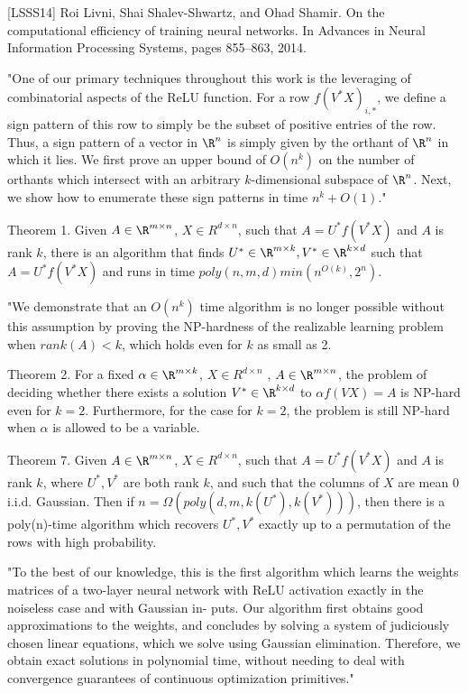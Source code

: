 \documentclass[english]{article}
\begin{document}
[LSSS14] Roi Livni, Shai Shalev-Shwartz, and Ohad Shamir. On the computational efficiency
of training neural networks. In Advances in Neural Information Processing Systems,
pages 855–863, 2014.

"One of our
primary techniques throughout this work is the leveraging of combinatorial aspects of the ReLU
function. For a row $f(V^* X)_{i,*}$, we define a sign pattern of this row to simply be the subset of
positive entries of the row. Thus, a sign pattern of a vector in $\R^n$ is simply given by the orthant
of $\R^n$ in which it lies. We first prove an upper bound of $O(n^k)$ on the number of orthants which
intersect with an arbitrary $k$-dimensional subspace of $\R^n$. Next, we show how to enumerate these
sign patterns in time $n^k+O(1)$."

Theorem 1. Given $A \in \R^{m\times n}$, $X \in R^{d\times n}$, such that $A = U^* f(V^* X)$ and $A$ is rank $k$, there
is an algorithm that finds $U^* \in \R^{m\times k} ,V^* \in \R^{k\times d}$ such that $A = U^* f(V^* X)$ and runs in time $
poly(n,m,d) min(n^{O(k)} ,2^n)$.

"We demonstrate that an $O(n^k)$ time algorithm is no longer
possible without this assumption by proving the NP-hardness of the realizable learning problem when $rank(A) < k$, which holds even for $k$ as small as 2. 


Theorem 2. For a fixed $\alpha \in \R^{m\times k}$, $X \in R^{d\times n}$ , $A \in \R^{m\times n}$, the problem of deciding whether there
exists a solution $V^* \in \R^{k\times d}$ to $\alpha f(VX) = A$ is NP-hard even for $k = 2$. Furthermore, for the case
for $k = 2$, the problem is still NP-hard when $\alpha$ is allowed to be a variable.

Theorem 7. Given $A \in \R^{m\times n}$, $X \in R^{d\times n}$, such that $A = U^* f(V^* X)$ and $A$ is rank $k$, where $U^*,V^*$ are both rank $k$, and such
that the columns of $X$ are mean 0 i.i.d. Gaussian. Then if $n = \Omega(poly(d,m,k(U^*),k(V^*)))$,
then there is a poly(n)-time algorithm which recovers $U^*,V^*$ exactly up to a permutation of the
rows with high probability.

"To the best of our knowledge, this is the first algorithm which learns the weights matrices of a
two-layer neural network with ReLU activation exactly in the noiseless case and with Gaussian in-
puts. Our algorithm first obtains good approximations to the weights, and concludes by
solving a system of judiciously chosen linear equations, which we solve using Gaussian elimination.
Therefore, we obtain exact solutions in polynomial time, without needing to deal with convergence
guarantees of continuous optimization primitives."
\end{document}
